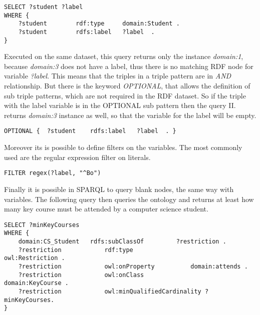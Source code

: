 \begin{lstlisting}[captionpos=b, caption=SPARQL Query II., label=2nd:sparql, belowskip=1em, aboveskip=2em,
basicstyle=\footnotesize,frame=single]
SELECT ?student ?label 
WHERE { 
	?student		rdf:type	 domain:Student .	
	?student		rdfs:label	 ?label  .
}
\end{lstlisting}

Executed on the same dataset, this query returns only the instance \textit{domain:1}, because \textit{domain:3} does not have a label, thus there is no matching RDF node for variable \textit{?label}. This means that the triples in a triple pattern are in \textit{AND} relationship. But there is the keyword \textit{OPTIONAL}, that allows the definition of sub triple patterns, which are not required in the RDF dataset. So if the triple with the label variable is in the OPTIONAL sub pattern then the query II. returns \textit{domain:3} instance as well, so that the variable for the label will be empty.

\begin{lstlisting}[captionpos=b, caption=Optional sub triple pattern., label=2nd:sparql, belowskip=1em, aboveskip=2em,
basicstyle=\footnotesize,frame=single]
OPTIONAL { 	?student	rdfs:label	 ?label  . } 
\end{lstlisting}

Moreover its is possible to define filters on the variables. The most commonly used are the regular expression filter on literals. 

\begin{lstlisting}[captionpos=b, caption=Regex filter in SPARQL, label=2nd:sparql, belowskip=1em, aboveskip=2em,
basicstyle=\footnotesize,frame=single]
FILTER regex(?label, "^Bo")
\end{lstlisting}

Finally it is possible in SPARQL to query blank nodes, the same way with variables. The following query then queries the ontology and returns at least how many key course must be attended by a computer science student.

\begin{lstlisting}[captionpos=b, caption=SPARQL Query III., label=3rd:sparql, belowskip=1em, aboveskip=2em,
basicstyle=\footnotesize,frame=single]
SELECT ?minKeyCourses
WHERE {
	domain:CS_Student	rdfs:subClassOf			?restriction .
	?restriction			rdf:type						owl:Restriction .
	?restriction			owl:onProperty			domain:attends .
	?restriction			owl:onClass					domain:KeyCourse .
	?restriction			owl:minQualifiedCardinality	?minKeyCourses.
}
\end{lstlisting}


